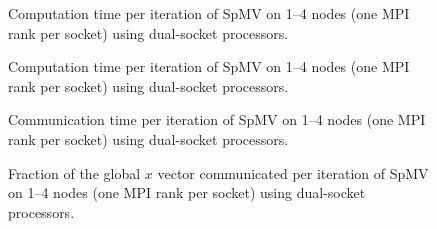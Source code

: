 \begin{figure}[H]
    \centering
    \caption{Computation time per iteration of SpMV on 1–4 nodes (one MPI rank per socket) using dual-socket \fpgaq{} processors.}
    \label{fig:tfpgaqmpimulti}
\end{figure}

\begin{figure}[H]
    \centering
    \caption{Computation time per iteration of SpMV on 1–4 nodes (one MPI rank per socket) using dual-socket \fpgaq{} processors.}
    \label{fig:tcompfpgaqmpimulti}
\end{figure}


\begin{figure}[H]
    \centering
    \caption{Communication time per iteration of SpMV on 1–4 nodes (one MPI rank per socket) using dual-socket \fpgaq{} processors.}
    \label{fig:tcommfpgaqmpimulti}
\end{figure}


\begin{figure}[H]
    \centering
    \caption{Fraction of the global \(x\) vector communicated per iteration of SpMV on 1–4 nodes (one MPI rank per socket) using dual-socket \fpgaq{} processors.}
    \label{fig:commloadfpgaqmpimulti}
\end{figure}
